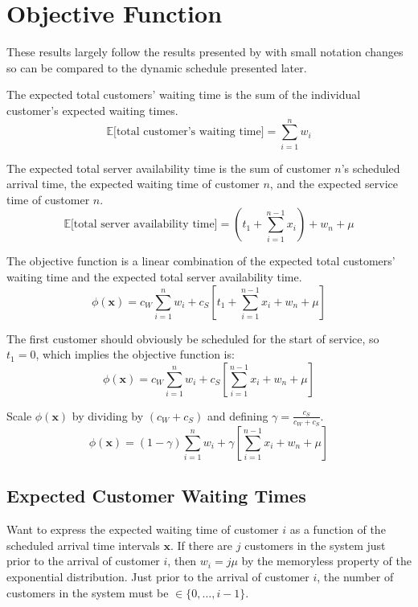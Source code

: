 \section{Objective Function}
These results largely follow the results presented by \citet{Pegden} with small notation changes so can be compared to the dynamic schedule presented later.

The expected total customers' waiting time is the sum of the individual customer's expected waiting times.
\begin{equation}
	\mathbb{E} \Big[\text{total customer's waiting time} \Big] = \sum_{i = 1}^{n} w_{i}
\end{equation}

The expected total server availability time is the sum of customer $n$'s scheduled arrival time, the expected waiting time of customer $n$, and the expected service time of customer $n$.
\begin{equation}
	\mathbb{E} \Big[\text{total server availability time} \Big] = \left( t_{1} + \sum_{i = 1}^{n - 1} x_{i} \right) + w_{n} + \mu
\end{equation}

The objective function is a linear combination of the expected total customers' waiting time and the expected total server availability time.
\begin{equation}
	\phi (\mathbf{x}) = c_{W} \sum_{i = 1}^{n} w_{i} + c_{S} \left[ t_{1} + \sum_{i = 1}^{n - 1} x_{i} + w_{n} + \mu \right]
\end{equation}

The first customer should obviously be scheduled for the start of service, so $t_{1} = 0$, which implies the objective function is:
\begin{equation}
	\phi (\mathbf{x}) = c_{W} \sum_{i = 1}^{n} w_{i} + c_{S} \left[ \sum_{i = 1}^{n - 1} x_{i} + w_{n} + \mu \right]
\end{equation}

Scale $\phi (\mathbf{x})$ by dividing by $(c_{W} + c_{S})$ and defining $\gamma = \frac{c_{S}}{c_{W} + c_{S}}$.
\begin{equation}
	\phi (\mathbf{x}) = (1 - \gamma) \sum_{i = 1}^{n} w_{i} + \gamma \left[ \sum_{i = 1}^{n - 1} x_{i} + w_{n} + \mu \right]
	\label{eqn:StaticObjective}
\end{equation}

\subsection{Expected Customer Waiting Times}
Want to express the expected waiting time of customer $i$ as a function of the scheduled arrival time intervals $\mathbf{x}$. If there are $j$ customers in the system just prior to the arrival of customer $i$, then $w_{i} = j \mu$ by the memoryless property of the exponential distribution. Just prior to the arrival of customer $i$, the number of customers in the system must be $\in \{ 0, \ldots, i - 1 \}$.


